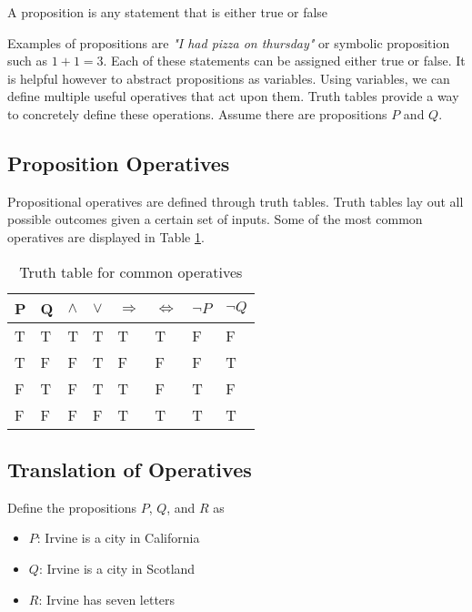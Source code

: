 \documentclass[../notes.tex]{subfiles}
\begin{document}

\begin{definition}[Propositions]
	A proposition is any statement that is either true or false
\end{definition}

Examples of propositions are \textit{"I had pizza on thursday"} or symbolic proposition such as $1 + 1 = 3$. Each of these statements can be assigned either true or false. It is helpful however to abstract propositions as variables. Using variables, we can define multiple useful operatives that act upon them. Truth tables provide a way to concretely define these operations. Assume there are propositions $P$ and $Q$.

\subsection{Proposition Operatives}

Propositional operatives are defined through truth tables. Truth tables lay out all possible outcomes given a certain set of inputs. Some of the most common operatives are displayed in Table \ref{tbl:propoperators}.

\begin{table}[h!]
	\centering
	\label{tbl:propoperators}
	\begin{tabular}{ll | llllll}
		P & Q & $\land$ & $\lor$ & $\Rightarrow$ & $\Leftrightarrow$ & $\lnot P$ & $\lnot Q$ \\\hline
		T & T & T & T & T & T & F & F \\ 
		T & F & F & T & F & F & F & T \\ 
		F & T & F & T & T & F & T & F \\ 
		F & F & F & F & T & T & T & T \\ 
	\end{tabular}
	\caption{Truth table for common operatives}
\end{table}

\subsection{Translation of Operatives}

Define the propositions $P$, $Q$, and $R$ as

\begin{itemize}
	\item $P$: Irvine is a city in California
	\item $Q$: Irvine is a city in Scotland
	\item $R$: Irvine has seven letters
\end{itemize}
\end{document}
